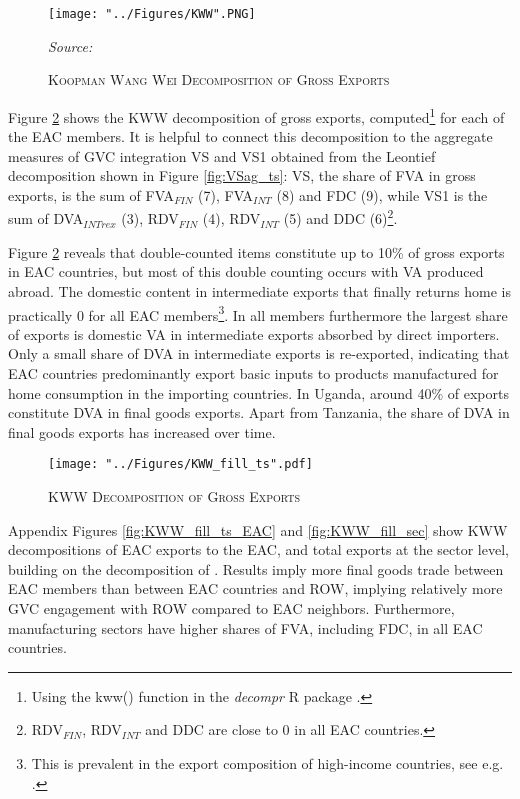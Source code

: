 \documentclass[a4paper]{article}
\begin{document}
\begin{figure}[h!]
\centering
\caption{\label{fig:KWW}\textsc{Koopman Wang Wei Decomposition of Gross Exports}}
\texttt{[image: "../Figures/KWW".PNG]} %
\raggedright
\scriptsize
\emph{Source:} \citet{koopman2014tracing}
\end{figure}
\FloatBarrier

Figure \ref{fig:KWW_fill_ts} shows the KWW decomposition of gross exports, computed\footnote{Using the kww() function in the \emph{decompr} R package \citep{Kummritz2014}.} for each of the EAC members. It is helpful to connect this decomposition to the aggregate measures of GVC integration VS and VS1 obtained from the Leontief decomposition shown in Figure \ref{fig:VSag_ts}: VS, the share of FVA in gross exports, is the sum of FVA$_{FIN}$ (7), FVA$_{INT}$ (8) and FDC (9), while VS1 is the sum of DVA$_{INTrex}$ (3), RDV$_{FIN}$ (4), RDV$_{INT}$ (5) and DDC (6)\footnote{RDV$_{FIN}$, RDV$_{INT}$  and DDC are close to 0 in all EAC countries.}.  \newline 

Figure \ref{fig:KWW_fill_ts} reveals that double-counted items constitute up to 10\% of gross exports in EAC countries, but most of this double counting occurs with VA produced abroad. The domestic content in intermediate exports that finally returns home is practically 0 for all EAC members\footnote{This is prevalent in the export composition of high-income countries, see e.g. \citep{Kummritz20162}.}. In all members furthermore the largest share of exports is domestic VA in intermediate exports absorbed by direct importers. Only a small share of DVA in intermediate exports is re-exported, indicating that EAC countries predominantly export basic inputs to products manufactured for home consumption in the importing countries. In Uganda, around 40\% of exports constitute DVA in final goods exports. Apart from Tanzania, the share of DVA in final goods exports has increased over time. \newline 

\begin{figure}[h!]
\centering
\caption{\label{fig:KWW_fill_ts}\textsc{KWW Decomposition of Gross Exports}}
\texttt{[image: "../Figures/KWW\_fill\_ts".pdf]} %
\end{figure}
\FloatBarrier

Appendix Figures \ref{fig:KWW_fill_ts_EAC} and \ref{fig:KWW_fill_sec} show KWW decompositions of EAC exports to the EAC, and total exports at the sector level, building on the decomposition of \citet{wang2013quantifying}. Results imply more final goods trade between EAC members than between EAC countries and ROW, implying relatively more GVC engagement with ROW compared to EAC neighbors. Furthermore, manufacturing sectors have higher shares of FVA, including FDC, in all EAC countries. 
\end{document}
